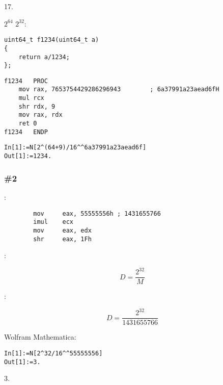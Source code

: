  17.

 $2^{64}$  $2^{32}$:

\begin{lstlisting}
uint64_t f1234(uint64_t a)
{
	return a/1234;
};
\end{lstlisting}

\begin{lstlisting}[caption=\Optimizing MSVC 2012 x64]
f1234	PROC
	mov	rax, 7653754429286296943		; 6a37991a23aead6fH
	mul	rcx
	shr	rdx, 9
	mov	rax, rdx
	ret	0
f1234	ENDP
\end{lstlisting}

\begin{lstlisting}[caption=Wolfram Mathematica]
In[1]:=N[2^(64+9)/16^^6a37991a23aead6f]
Out[1]:=1234.
\end{lstlisting}

\subsubsection{ \#2}

:

\begin{lstlisting}
		mov     eax, 55555556h ; 1431655766
		imul    ecx
		mov     eax, edx
		shr     eax, 1Fh
\end{lstlisting}

:

\[
D=\frac{2^{32}}{M}
\]

:

\[
D=\frac{2^{32}}{1431655766}
\]

 Wolfram Mathematica:

\begin{lstlisting}[caption=Wolfram Mathematica]
In[1]:=N[2^32/16^^55555556]
Out[1]:=3.
\end{lstlisting}

 3.
